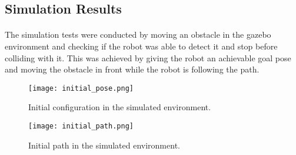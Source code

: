 \subsection{Simulation Results}
\paragraph{} The simulation tests were conducted by moving an obstacle in the 
gazebo environment and checking if the robot was able to detect it and stop 
before colliding with it. This was achieved by giving the robot an achievable 
goal pose and moving the obstacle in front while the robot is following the path.

\begin{figure}[h]
    \centering
    \texttt{[image: initial\_pose.png]}
    \caption{Initial configuration in the simulated environment.}
    \label{fig:sim_obstacle_detection1}
\end{figure}
\begin{figure}[h]
    \centering
    \texttt{[image: initial\_path.png]}
    \caption{Initial path in the simulated environment.}
    \label{fig:sim_obstacle_detection2}
\end{figure}